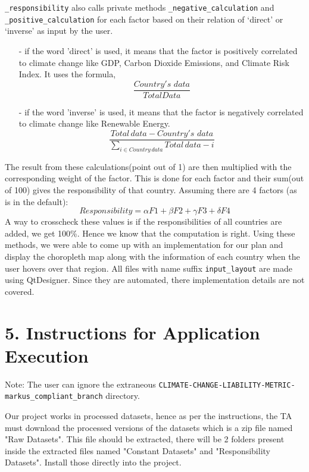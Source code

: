\documentclass[fontsize=11pt]{article}
\begin{document}
    \texttt{\_responsibility} also calls private methods \texttt{\_negative\_calculation} and \texttt{\_positive\_calculation} for each factor based on
    their relation of ‘direct’ or ‘inverse’ as input by the user.\newline
    \begin{enumerate}
        \item [-] if the word 'direct' is used, it means that the factor is positively correlated to climate change like
        GDP, Carbon Dioxide Emissions, and Climate Risk Index. It uses the formula,
        \[
            \frac{Country's \, \, data}{Total Data}
        \]

        \item [-] if the word 'inverse' is used, it means that the factor is negatively correlated to climate change like
        Renewable Energy.
        \[
            \frac{Total \, data - Country's \, \, data}{\displaystyle\sum_{i \in Country \, data} Total \, data - i }
        \]
    \end{enumerate}
    The result from these calculations(point out of 1) are then multiplied with the corresponding weight of the factor.
    This is done for each factor and their sum(out of 100) gives the responsibility of that country. Assuming there are 4 factors (as is in the default):
    \[
        Responsibility = \alpha F1 + \beta F2 + \gamma F3 + \delta F4
    \]
    A way to crosscheck these values
    is if the responsibilities of all countries are added, we get 100\%. Hence we know that the computation is right.
    \newline
    Using these methods, we were able to come up with an implementation for our plan and display the
    choropleth map along with the information of each country when the user hovers over that region.\newline
    All files with name suffix \texttt{input\_layout} are made using QtDesigner. Since they are automated,
    there implementation details are not covered.
    
    \section*{5. Instructions for Application Execution}
    Note: The user can ignore the extraneous \texttt{CLIMATE-CHANGE-LIABILITY-METRIC-markus\_compliant\_branch} directory.\newline
    
    Our project works in processed datasets, hence as per the instructions, the TA must download the processed versions
    of the datasets which is a zip file named "Raw Datasets". This file should be extracted, there will be 2 folders present
    inside the extracted files named "Constant Datasets" and "Responsibility Datasets". Install those directly into the project.\newline
\end{document}
